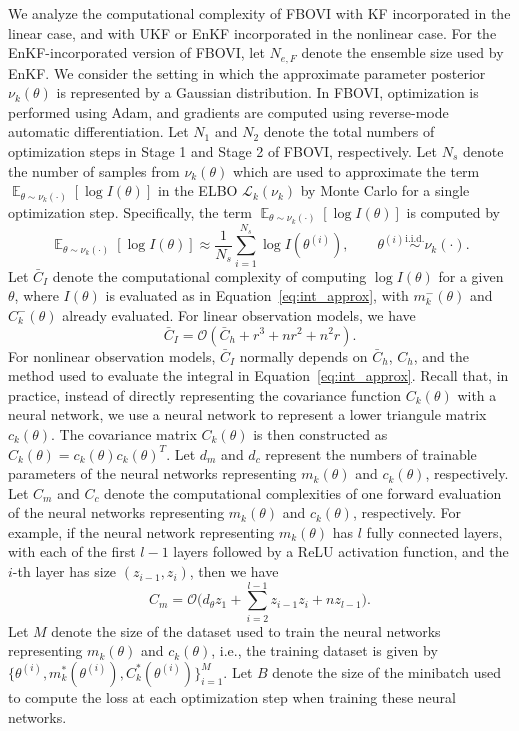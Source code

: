 \documentclass[preprint,3p,times]{elsarticle}
\DeclareMathOperator{\E}{\mathbb{E}}
\begin{document}
We analyze the computational complexity of FBOVI with KF incorporated in the linear case, and with UKF or EnKF incorporated in the nonlinear case. For the EnKF-incorporated version of FBOVI, let $N_{e,F}$ denote the ensemble size used by EnKF. We consider the setting in which the approximate parameter posterior $\nu_k(\theta)$ is represented by a Gaussian distribution. In FBOVI, optimization is performed using Adam, and gradients are computed using reverse-mode automatic differentiation. Let $N_1$ and $N_2$ denote the total numbers of optimization steps in Stage 1 and Stage 2 of FBOVI, respectively. Let $N_s$ denote the number of samples from $\nu_k(\theta)$ which are used to approximate the term $\E_{\theta\sim \nu_k(\cdot)}[\log I(\theta)]$ in the ELBO $\mathcal{L}_k(\nu_k)$ by Monte Carlo for a single optimization step. Specifically, the term $\E_{\theta\sim \nu_k(\cdot)}[\log I(\theta)]$ is computed by
\begin{equation}
\E_{\theta \sim \nu_k(\cdot)}[\log I(\theta)]
\approx
\frac{1}{N_s}\sum_{i=1}^{N_s}\log I(\theta^{(i)}),
\qquad
\theta^{(i)} \overset{\mathrm{i.i.d.}}{\sim} \nu_k(\cdot).
\label{eq:approx_E_logI}
\end{equation}
Let $\bar{C}_I$ denote the computational complexity of computing $\log I(\theta)$ for a given $\theta$, where $I(\theta)$ is evaluated as in Equation~\eqref{eq:int_approx}, with $m_k^-(\theta)$ and $C_k^-(\theta)$ already evaluated. For linear observation models, we have
\[
\bar{C}_I=\mathcal{O}(\bar{C}_h+r^3+nr^2+n^2r).
\]
For nonlinear observation models, $\bar{C}_I$ normally depends on $\bar{C}_h$, $C_h$, and the method used to evaluate the integral in Equation~\eqref{eq:int_approx}. Recall that, in practice, instead of directly representing the covariance function $C_k(\theta)$ with a neural network, we use a neural network to represent a lower triangule matrix $c_k(\theta)$. The covariance matrix $C_k(\theta)$ is then constructed as $C_k(\theta)=c_k(\theta)c_k(\theta)^T$. Let $d_m$ and $d_c$ represent the numbers of trainable parameters of the neural networks representing $m_k(\theta)$ and $c_k(\theta)$, respectively. Let $C_m$ and $C_c$ denote the computational complexities of one forward evaluation of the neural networks representing $m_k(\theta)$ and $c_k(\theta)$, respectively. For example, if the neural network representing $m_k(\theta)$ has $l$ fully connected layers, with each of the first $l-1$ layers followed by a ReLU activation function, and the $i$-th layer has size $(z_{i-1},z_i)$, then we have
\[
C_m=\mathcal{O}\bigg(d_{\theta}z_1+\sum_{i=2}^{l-1}z_{i-1}z_i+nz_{l-1}\bigg).
\]
Let $M$ denote the size of the dataset used to train the neural networks representing $m_k(\theta)$ and $c_k(\theta)$, i.e., the training dataset is given by
$\{\theta^{(i)},m_k^*(\theta^{(i)}),C_k^*(\theta^{(i)})\}_{i=1}^M$. Let $B$ denote the size of the minibatch used to compute the loss at each optimization step when training these neural networks. 
\end{document}

